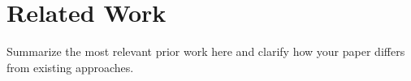 \section{Related Work}
\label{sec:related_work}

Summarize the most relevant prior work here and clarify how your paper differs from existing approaches.
